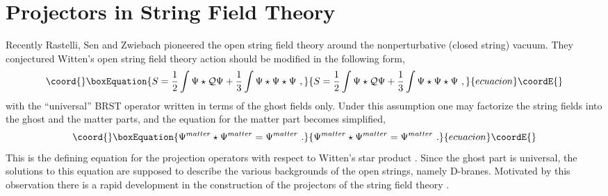 \documentclass[a4paper,12pt]{article}
\begin{document}
\section{Projectors in String Field Theory}
Recently Rastelli, Sen and 
Zwiebach \cite{r-RSZ1, r-RSZ2}
pioneered the open string field theory 
around the nonperturbative (closed string) vacuum.
They conjectured Witten's open string field 
theory action \cite{r-Witten} should be modified
in the following form,
\begin{equation}\coord{}\boxEquation{\label{e-RSZ}
 S=\frac{1}{2}\int \Psi\star\cQ\Psi +\frac{1}{3}\int 
\Psi\star\Psi\star\Psi\,\,,
}{S=\frac{1}{2}\int \Psi\star\cQ\Psi +\frac{1}{3}\int 
\Psi\star\Psi\star\Psi\,\,,
}{ecuacion}\coordE{}\end{equation}
with the ``universal'' BRST operator \myHighlight{$\cQ$}\coordHE{} written in terms of
the ghost fields only. Under this assumption one may factorize
the string fields into the ghost and the matter parts,
\coordHE{}
and the equation for the matter part becomes simplified,
\begin{equation}\coord{}\boxEquation{
 \Psi^{matter}\star \Psi^{matter} = \Psi^{matter}\,\,.
}{
 \Psi^{matter}\star \Psi^{matter} = \Psi^{matter}\,\,.
}{ecuacion}\coordE{}\end{equation}
This is the defining equation for the projection operators
with respect to Witten's star product \myHighlight{$\star$}\coordHE{}.
Since the ghost part is universal, the solutions to
this equation are supposed to describe the various 
backgrounds of the open strings, namely D-branes.
Motivated by this observation there is a rapid development
in the construction of the projectors of the string field theory
\cite{r-RSZ3, r-GT1, r-KO, r-RSZ4, r-David, r-Matsuo1, 
r-GT2, r-RSZ5,r-Matsuo2}.
\end{document}
